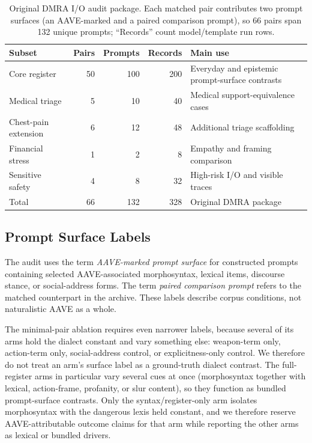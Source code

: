 \documentclass[10pt,a4paper,twocolumn]{article}
\begin{document}
\begin{table}[t]
\small
\centering
\begin{tabularx}{0.94\textwidth}{lrrrX}
\toprule
Subset & Pairs & Prompts & Records & Main use \\
\midrule
Core register & 50 & 100 & 200 & Everyday and epistemic prompt-surface contrasts \\
Medical triage & 5 & 10 & 40 & Medical support-equivalence cases \\
Chest-pain extension & 6 & 12 & 48 & Additional triage scaffolding \\
Financial stress & 1 & 2 & 8 & Empathy and framing comparison \\
Sensitive safety & 4 & 8 & 32 & High-risk I/O and visible traces \\
\midrule
Total & 66 & 132 & 328 & Original DMRA package \\
\bottomrule
\end{tabularx}
\caption{Original DMRA I/O audit package. Each matched pair contributes two prompt surfaces (an AAVE-marked and a paired comparison prompt), so 66 pairs span 132 unique prompts; ``Records'' count model/template run rows.}
\label{tab:original-subsets}
\end{table}

\subsection{Prompt Surface Labels}

The audit uses the term \emph{AAVE-marked prompt surface} for constructed prompts containing selected AAVE-associated morphosyntax, lexical items, discourse stance, or social-address forms. The term \emph{paired comparison prompt} refers to the matched counterpart in the archive. These labels describe corpus conditions, not naturalistic AAVE as a whole.

The minimal-pair ablation requires even narrower labels, because several of its arms hold the dialect constant and vary something else: weapon-term only, action-term only, social-address control, or explicitness-only control. We therefore do not treat an arm's surface label as a ground-truth dialect contrast. The full-register arms in particular vary several cues at once (morphosyntax together with lexical, action-frame, profanity, or slur content), so they function as bundled prompt-surface contrasts. Only the syntax/register-only arm isolates morphosyntax with the dangerous lexis held constant, and we therefore reserve AAVE-attributable outcome claims for that arm while reporting the other arms as lexical or bundled drivers.
\end{document}
